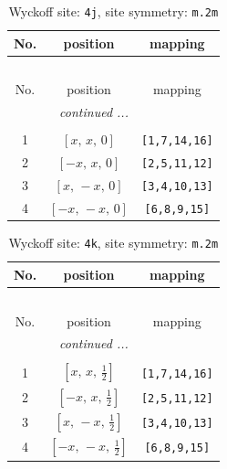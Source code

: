 \documentclass[fleqn,8pt]{jsarticle}
\begin{document}
\begin{longtable}{ccc}
\caption{Wyckoff site: {\tt 4j}, site symmetry: {\tt m.2m}}
 \\
 \hline \hline
No. & position & mapping \\ \hline \endfirsthead

\multicolumn{2}{l}{\tablename\ \thetable{}} \\
 \hline \hline
No. & position & mapping \\ \hline \endhead

 \hline \hline
\multicolumn{2}{r}{\footnotesize\it continued ...} \\ \endfoot

 \hline \hline
\multicolumn{2}{r}{} \\ \endlastfoot

1 & $\left[ x,\, x,\, 0 \right]$ & {\tt [1,7,14,16]} \\ \hline
2 & $\left[ - x,\, x,\, 0 \right]$ & {\tt [2,5,11,12]} \\ \hline
3 & $\left[ x,\, - x,\, 0 \right]$ & {\tt [3,4,10,13]} \\ \hline
4 & $\left[ - x,\, - x,\, 0 \right]$ & {\tt [6,8,9,15]} \\
\end{longtable}
\renewcommand{\arraystretch}{1.2}
\begin{longtable}{ccc}
\caption{Wyckoff site: {\tt 4k}, site symmetry: {\tt m.2m}}
 \\
 \hline \hline
No. & position & mapping \\ \hline \endfirsthead

\multicolumn{2}{l}{\tablename\ \thetable{}} \\
 \hline \hline
No. & position & mapping \\ \hline \endhead

 \hline \hline
\multicolumn{2}{r}{\footnotesize\it continued ...} \\ \endfoot

 \hline \hline
\multicolumn{2}{r}{} \\ \endlastfoot

1 & $\left[ x,\, x,\, \frac{1}{2} \right]$ & {\tt [1,7,14,16]} \\ \hline
2 & $\left[ - x,\, x,\, \frac{1}{2} \right]$ & {\tt [2,5,11,12]} \\ \hline
3 & $\left[ x,\, - x,\, \frac{1}{2} \right]$ & {\tt [3,4,10,13]} \\ \hline
4 & $\left[ - x,\, - x,\, \frac{1}{2} \right]$ & {\tt [6,8,9,15]} \\
\end{longtable}
\end{document}
